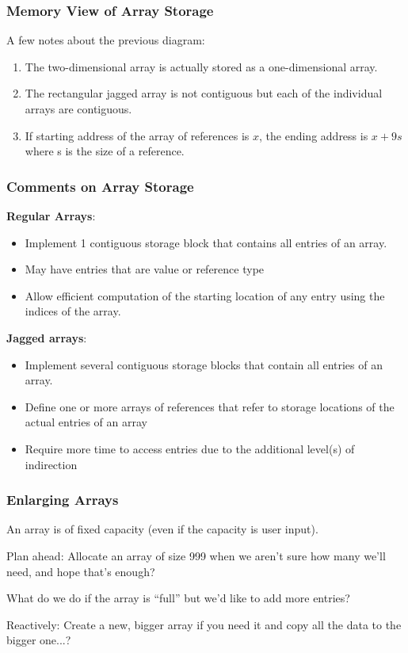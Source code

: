 \begin{frame}
\frametitle{Memory View of Array Storage}
A few notes about the previous diagram:
\begin{enumerate}
\item The two-dimensional array is actually stored as a one-dimensional array.
\item The rectangular jagged array is not contiguous but each of the individual arrays are contiguous.
\item If starting address of the array of references is $x$, the ending address is $x + 9s$ where s is the size of a reference.
\end{enumerate}

\end{frame}

\begin{frame}
\frametitle{Comments on Array Storage}
\textbf{Regular Arrays}:

\begin{itemize}
	\item Implement 1 contiguous storage block that contains all entries of an array.
	\item May have entries that are value or reference type
	\item Allow efficient computation of the starting location of any entry using the indices of the array.
\end{itemize}

\textbf{Jagged arrays}:
\begin{itemize}
	\item  Implement several contiguous storage blocks that contain all entries of an array.
	\item Define one or more arrays of references that refer to storage locations of the actual entries of an array
	\item Require more time to access entries due to the additional level(s) of indirection
\end{itemize}

\end{frame}

\begin{frame}
\frametitle{Enlarging Arrays}

An array is of fixed capacity (even if the capacity is user input).

Plan ahead: Allocate an array of size 999 when we aren't sure how many we'll need, and hope that's enough?

What do we do if the array is ``full'' but we'd like to add more entries?

Reactively: Create a new, bigger array if you need it and copy all the data to the bigger one...? 

\end{frame}

